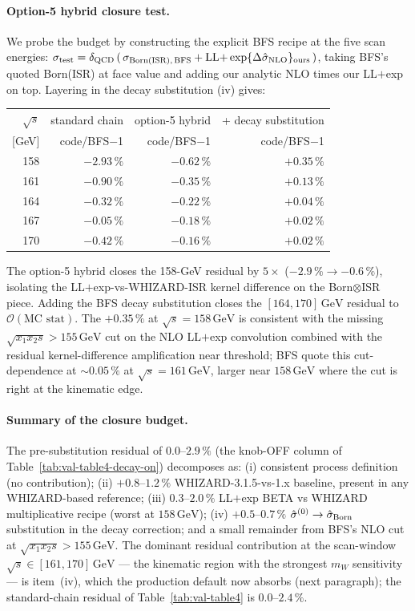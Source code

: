 \documentclass[11pt,a4paper]{article}
\newcommand{\mW}{m_W}
\newcommand{\sqrts}{\sqrt{s}}
\newcommand{\GeV}{\ensuremath{\,\mathrm{GeV}}}
\begin{document}
\paragraph{Option-5 hybrid closure test.}
We probe the budget by constructing the explicit BFS recipe at the
five scan energies: $\sigma_{\rm test} = \delta_{\rm QCD}\,(\,\sigma_{\rm Born(ISR),\,BFS} + \mathrm{LL}{+}\exp\{\Delta\hat\sigma_{\rm NLO}\}_{\rm ours}\,)$, taking BFS's quoted Born(ISR)
at face value and adding our analytic NLO times our LL$+$exp on top.
Layering in the decay substitution (iv) gives:
\begin{center}\small
\setlength{\tabcolsep}{4pt}
\begin{tabular}{r r r r}
\toprule
$\sqrts$ & standard chain & option-5 hybrid & + decay substitution \\
{}[GeV]  & code/BFS$-$1 & code/BFS$-$1 & code/BFS$-$1 \\
\midrule
158 & $-2.93\,\%$ & $-0.62\,\%$ & $+0.35\,\%$ \\
161 & $-0.90\,\%$ & $-0.35\,\%$ & $+0.13\,\%$ \\
164 & $-0.32\,\%$ & $-0.22\,\%$ & $+0.04\,\%$ \\
167 & $-0.05\,\%$ & $-0.18\,\%$ & $+0.02\,\%$ \\
170 & $-0.42\,\%$ & $-0.16\,\%$ & $+0.02\,\%$ \\
\bottomrule
\end{tabular}
\end{center}
The option-5 hybrid closes the 158-GeV residual by $5\times$
(${-}2.9\,\%\to{-}0.6\,\%$), isolating the LL$+$exp-vs-WHIZARD-ISR
kernel difference on the Born$\otimes$ISR piece. Adding the BFS decay
substitution closes the $[164,170]\GeV$ residual to
$\mathcal{O}(\text{MC stat})$. The $+0.35\,\%$ at $\sqrts=158\GeV$ is
consistent with the missing $\sqrt{x_1 x_2 s}>155\GeV$ cut on the NLO
LL$+$exp convolution combined with the residual kernel-difference
amplification near threshold; BFS quote this cut-dependence at
${\sim}0.05\,\%$ at $\sqrts=161\GeV$, larger near $158\GeV$ where the
cut is right at the kinematic edge.

\paragraph{Summary of the closure budget.}
The pre-substitution residual of $0.0$--$2.9\,\%$ (the knob-OFF column
of Table~\ref{tab:val-table4-decay-on})
decomposes as: (i) consistent process definition (no contribution);
(ii) $+0.8$--$1.2\,\%$ WHIZARD-3.1.5-vs-1.x baseline, present in any
WHIZARD-based reference; (iii) $0.3$--$2.0\,\%$ LL$+$exp BETA vs
WHIZARD multiplicative recipe (worst at $158\GeV$); (iv) $+0.5$--$0.7\,\%$
$\hat\sigma^{(0)}\to\hat\sigma_{\rm Born}$ substitution in the decay
correction; and a small remainder from BFS's NLO cut at
$\sqrt{x_1 x_2 s}>155\GeV$. The dominant residual contribution at
the scan-window $\sqrts\in[161,170]\GeV$ — the kinematic region with
the strongest $\mW$ sensitivity — is item~(iv), which the production
default now absorbs (next paragraph); the standard-chain residual of
Table~\ref{tab:val-table4} is $0.0$--$2.4\,\%$.
\end{document}
